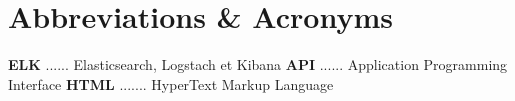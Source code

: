 \chapter*{Abbreviations \& Acronyms}

\textbf{ELK} ...... Elasticsearch, Logstach et Kibana
\newline
\textbf{API} ...... Application Programming Interface
\newline
\textbf{HTML} ....... HyperText Markup Language